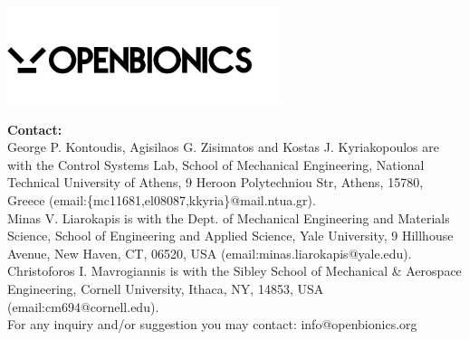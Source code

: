 \documentclass[a4paper]{report}
\begin{document}
	\vspace{12cm}

\begin{center}
 \includegraphics[width=8cm]{figures/openbionics.png}
\end{center}

	{\Large \bfseries Contact: }\\

        \noindent George P. Kontoudis, Agisilaos G. Zisimatos and Kostas J. Kyriakopoulos are with the Control Systems Lab, School of Mechanical Engineering, National Technical University of Athens, 9 Heroon Polytechniou Str, Athens, 15780, Greece (email:\{mc11681,el08087,kkyria\}@mail.ntua.gr).\\

        \noindent Minas V. Liarokapis is with the Dept. of Mechanical Engineering and Materials Science, School of Engineering and Applied Science, Yale University, 9 Hillhouse Avenue, New Haven, CT, 06520, USA (email:minas.liarokapis@yale.edu).\\

        \noindent Christoforos I. Mavrogiannis is with the Sibley School of Mechanical \& Aerospace Engineering, Cornell University, Ithaca, NY, 14853, USA (email:cm694@cornell.edu).\\

	\noindent For any inquiry and/or suggestion you may contact: info@openbionics.org 
	

\newpage
\tableofcontents
\newpage









 

\end{document}
